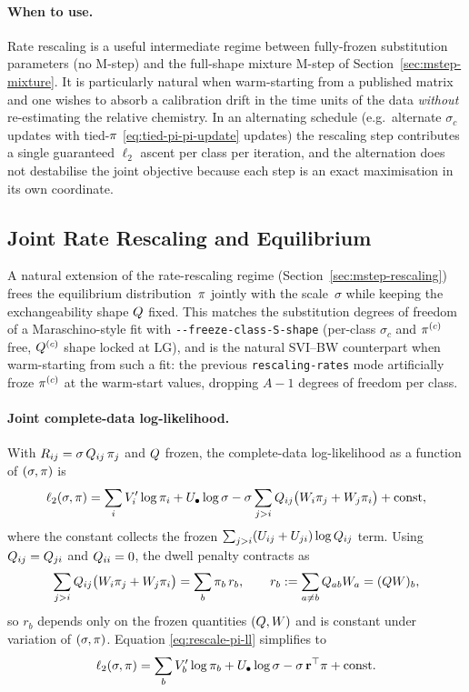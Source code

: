 \paragraph{When to use.}
Rate rescaling is a useful intermediate regime between fully-frozen
substitution parameters (no M-step) and the full-shape mixture M-step
of Section~\ref{sec:mstep-mixture}.  It is particularly natural when
warm-starting from a published matrix and one wishes to absorb a
calibration drift in the time units of the data \emph{without}
re-estimating the relative chemistry.  In an alternating schedule
(e.g.\ alternate $\sigma_c$ updates with tied-$\pi$
\eqref{eq:tied-pi-pi-update} updates) the rescaling step
contributes a single guaranteed $\ell_2$ ascent per class per
iteration, and the alternation does not destabilise the joint
objective because each step is an exact maximisation in its own
coordinate.


\subsection{Joint Rate Rescaling and Equilibrium}
\label{sec:mstep-rescaling-pi}

A natural extension of the rate-rescaling regime
(Section~\ref{sec:mstep-rescaling}) frees the equilibrium
distribution~$\pi$ jointly with the scale~$\sigma$ while keeping the
exchangeability shape $Q$ fixed.  This matches the substitution
degrees of freedom of a Maraschino-style fit with
\verb|--freeze-class-S-shape| (per-class $\sigma_c$ and $\pi^{(c)}$
free, $Q^{(c)}$ shape locked at LG), and is the natural
SVI--BW counterpart when warm-starting from such a fit: the previous
\verb|rescaling-rates| mode artificially froze $\pi^{(c)}$ at the
warm-start values, dropping $A-1$ degrees of freedom per class.

\paragraph{Joint complete-data log-likelihood.}
With $R_{ij} = \sigma\,Q_{ij}\,\pi_j$ and $Q$ frozen,
the complete-data log-likelihood as a function of $(\sigma, \pi)$ is
\begin{equation}\label{eq:rescale-pi-ll}
\ell_2(\sigma, \pi) =
   \sum_i V'_i \log \pi_i + U_\bullet \log \sigma
   - \sigma \sum_{j>i} Q_{ij}\bigl(W_i \pi_j + W_j \pi_i\bigr)
   + \mathrm{const},
\end{equation}
where the constant collects the frozen $\sum_{j>i}(U_{ij}+U_{ji})\log Q_{ij}$
term.  Using $Q_{ij} = Q_{ji}$ and $Q_{ii} = 0$, the dwell
penalty contracts as
\[
\sum_{j>i}Q_{ij}\bigl(W_i\pi_j + W_j\pi_i\bigr)
= \sum_b \pi_b\,r_b,
\qquad
r_b := \sum_{a\neq b} Q_{ab} W_a = (Q W)_b,
\]
so $r_b$ depends only on the frozen quantities $(Q, W)$ and is
constant under variation of $(\sigma, \pi)$.  Equation
\eqref{eq:rescale-pi-ll} simplifies to
\begin{equation}\label{eq:rescale-pi-ll-simple}
\ell_2(\sigma, \pi) =
   \sum_b V'_b \log \pi_b + U_\bullet \log \sigma
   - \sigma\,\mathbf{r}^\top \pi + \mathrm{const}.
\end{equation}

